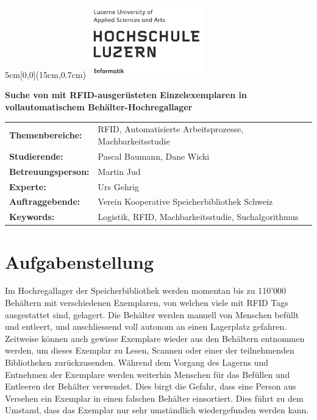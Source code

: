 \documentclass[
	a4paper
]{scrartcl}
\begin{document}

\begin{textblock*}{5cm}[0,0](15cm,0.7cm)
	\includegraphics[keepaspectratio,width=5cm]{img/HSLU_Logo}
\end{textblock*}

\vspace*{2cm}

\noindent
\textbf{\LARGE{Suche von mit RFID-ausgerüsteten Einzelexemplaren in vollautomatischem
Behälter-Hochregallager}} \\

\vspace{0.5em}

\bgroup
\setlength\tabcolsep{0cm}

\begin{large}
\noindent
\begin{tabularx}{\textwidth}{p{5cm}X}
	\textbf{Themenbereiche:} & RFID, Automatisierte Arbeitsprozesse, Machbarkeitsstudie\\
	\textbf{Studierende:} & Pascal Baumann, Dane Wicki\\
	\textbf{Betreuungsperson:} & Martin Jud\\
	\textbf{Experte:} & Urs Gehrig\\
	\textbf{Auftraggebende:} & Verein Kooperative Speicherbibliothek Schweiz\\
	\textbf{Keywords:} & Logistik, RFID, Machbarkeitsstudie, Suchalgorithmus\\
\end{tabularx}
\end{large}
\egroup

\section{Aufgabenstellung}
Im Hochregallager der Speicherbibliothek werden momentan bis zu 110'000 Behältern mit verschiedenen Exemplaren, von welchen viele mit RFID Tags ausgestattet sind, gelagert. Die Behälter werden manuell von Menschen befüllt und entleert, und anschliessend voll autonom an einen Lagerplatz gefahren. Zeitweise können auch gewisse Exemplare wieder aus den Behältern entnommen werden, um dieses Exemplar zu Lesen, Scannen oder einer der teilnehmenden Bibliotheken zurückzusenden. Während dem Vorgang des Lagerns und Entnehmen der Exemplare werden weiterhin Menschen für das Befüllen und Entleeren der Behälter verwendet. Dies birgt die Gefahr, dass eine Person aus Versehen ein Exemplar in einen falschen Behälter einsortiert. Dies führt zu dem Umstand, dass das Exemplar nur sehr umständlich wiedergefunden werden kann.
\end{document}
